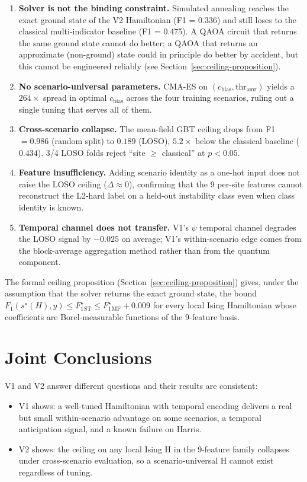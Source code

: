 \documentclass[12pt, a4paper, oneside]{report}
\begin{document}
\begin{enumerate}
    \item \textbf{Solver is not the binding constraint.} Simulated annealing reaches the exact ground state of the V2 Hamiltonian (F1 = 0.336) and still loses to the classical multi-indicator baseline (F1 = 0.475). A QAOA circuit that returns the same ground state cannot do better; a QAOA that returns an approximate (non-ground) state could in principle do better by accident, but this cannot be engineered reliably (see Section~\ref{sec:ceiling-proposition}).
    \item \textbf{No scenario-universal parameters.} CMA-ES on $(c_\text{bias}, \text{thr}_\text{amr})$ yields a $264\times$ spread in optimal $c_\text{bias}$ across the four training scenarios, ruling out a single tuning that serves all of them.
    \item \textbf{Cross-scenario collapse.} The mean-field GBT ceiling drops from F1 $= 0.986$ (random split) to $0.189$ (LOSO), $5.2\times$ below the classical baseline ($0.434$). 3/4 LOSO folds reject ``site $\ge$ classical'' at $p < 0.05$.
    \item \textbf{Feature insufficiency.} Adding scenario identity as a one-hot input does not raise the LOSO ceiling ($\Delta \approx 0$), confirming that the 9 per-site features cannot reconstruct the L2-hard label on a held-out instability class even when class identity is known.
    \item \textbf{Temporal channel does not transfer.} V1's $\psi$ temporal channel degrades the LOSO signal by $-0.025$ on average; V1's within-scenario edge comes from the block-average aggregation method rather than from the quantum component.
\end{enumerate}

The formal ceiling proposition (Section~\ref{sec:ceiling-proposition}) gives, under the assumption that the solver returns the exact ground state, the bound $F_1(s^\star(H), y) \le F_1^\star_{\mathrm{ST}} \le F_1^\star_{\mathrm{MF}} + 0.009$ for every local Ising Hamiltonian whose coefficients are Borel-measurable functions of the 9-feature basis.

\section{Joint Conclusions}

V1 and V2 answer different questions and their results are consistent:
\begin{itemize}
    \item V1 shows: a well-tuned Hamiltonian with temporal encoding delivers a real but small within-scenario advantage on some scenarios, a temporal anticipation signal, and a known failure on Harris.
    \item V2 shows: the ceiling on any local Ising H in the 9-feature family collapses under cross-scenario evaluation, so a scenario-universal H cannot exist regardless of tuning.
\end{itemize}
\end{document}
